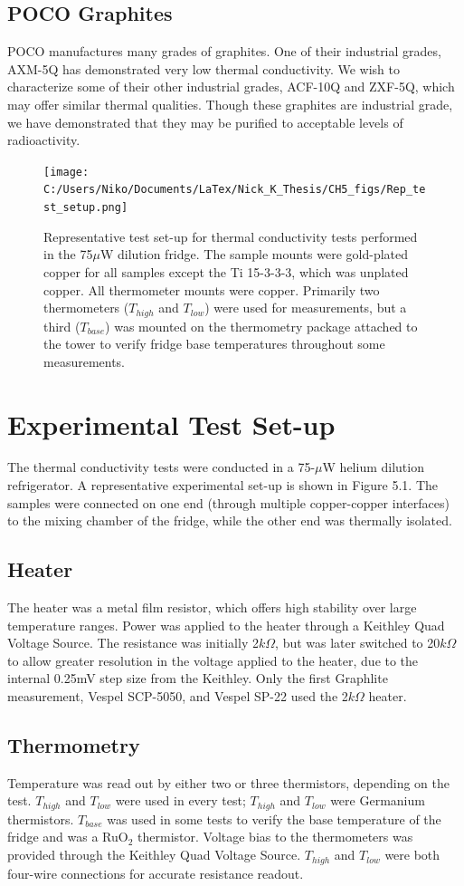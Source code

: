 \documentclass{report}
\begin{document}
\subsection{POCO Graphites}
POCO manufactures many grades of graphites. One of their industrial grades, AXM-5Q has demonstrated very low thermal conductivity. We wish to characterize some of their other industrial grades, ACF-10Q and ZXF-5Q, which may offer similar thermal qualities. Though these graphites are industrial grade, we have demonstrated that they may be purified to acceptable levels of radioactivity.

\begin{figure}[h]
\centering
\texttt{[image: C:/Users/Niko/Documents/LaTex/Nick\_K\_Thesis/CH5\_figs/Rep\_test\_setup.png]}
\caption{Representative test set-up for thermal conductivity tests performed in the 75$\mu$W dilution fridge. The sample mounts were gold-plated copper for all samples except the Ti 15-3-3-3, which was unplated copper. All thermometer mounts were copper. Primarily two thermometers ($T_{high}$ and $T_{low}$) were used for measurements, but a third ($T_{base}$) was mounted on the thermometry package attached to the tower to verify fridge base temperatures throughout some measurements. }
\end{figure}
\section{Experimental Test Set-up}
The thermal conductivity tests were conducted in a 75-$\mu$W helium dilution refrigerator. A representative experimental set-up is shown in Figure 5.1. The samples were connected on one end (through multiple copper-copper interfaces) to the mixing chamber of the fridge, while the other end was thermally isolated.

\subsection{Heater}
The heater was a metal film resistor, which offers high stability over large temperature ranges. Power was applied to the heater through a Keithley Quad Voltage Source. The resistance was initially 2$k\Omega$, but was later switched to 20$k\Omega$ to allow greater resolution in the voltage applied to the heater, due to the internal 0.25mV step size from the Keithley. Only the first Graphlite measurement, Vespel SCP-5050, and Vespel SP-22 used the 2$k\Omega$ heater.

\subsection{Thermometry}
Temperature was read out by either two or three thermistors, depending on the test. $T_{high}$ and $T_{low}$ were used in every test; $T_{high}$ and $T_{low}$ were Germanium thermistors. $T_{base}$ was used in some tests to verify the base temperature of the fridge and was a RuO$_{2}$ thermistor. Voltage bias to the thermometers was provided through the Keithley Quad Voltage Source. $T_{high}$ and $T_{low}$ were both four-wire connections for accurate resistance readout.
\end{document}
